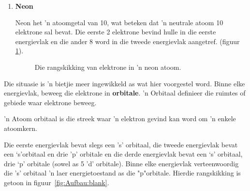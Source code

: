 \begin{enumerate}[noitemsep, label=\textbf{\arabic*}. ]
\item{\textbf{Neon} \\
\begin{minipage}{.4\textwidth}
Neon het  'n atoomgetal van 10, wat beteken dat  'n neutrale atoom 10 elektrone sal bevat. Die eerste 2 elektrone bevind hulle in die eerste energievlak en die ander 8 word in die tweede energievlak aangetref. (figuur \ref{fig:atom:argon}).
\end{minipage}
\begin{minipage}{.6\textwidth}
\begin{figure}[H]
\begin{center}
\caption{Die rangskikking van elektrone in  'n neon atoom.}
\label{fig:atom:argon}
\end{center}
\end{figure}
\end{minipage}
}
\end{enumerate}


\label{m38741*id259478}Die situasie is  'n bietjie meer ingewikkeld as wat hier voorgestel word. Binne elke energievlak, beweeg die elektrone in \textbf{orbitale}.  'n Orbitaal definieer die ruimtes of gebiede waar elektrone beweeg.\par 

 { 'n Atoom orbitaal is die streek waar  'n elektron gevind kan word om  'n enkele atoomkern.} 

\label{m38741*id6732}
Die eerste energievlak bevat slegs een 's' orbitaal, die tweede energievlak bevat een ‘s’orbitaal en drie 'p' orbitale en die derde energievlak bevat een ‘s’ orbitaal, drie ‘p’ orbitale (sowel as 5 'd' orbitale). Binne elke energievlak verteenwoordig die 's' orbitaal  'n laer energietoestand as die "p"orbitale. Hierdie rangskikking is getoon in figuur~\ref{fig:Aufbau:blank}. 

